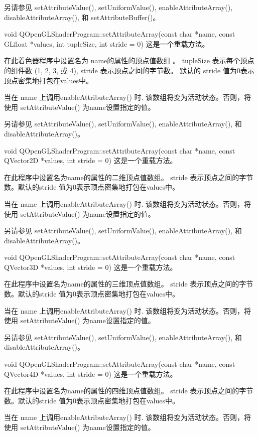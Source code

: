另请参见 setAttributeValue(), setUniformValue(), enableAttributeArray(), disableAttributeArray(), 和 setAttributeBuffer()。

void QOpenGLShaderProgram::setAttributeArray(const char *name, const GLfloat *values, int tupleSize, int stride = 0)
这是一个重载方法。

在此着色器程序中设置名为 name的属性的顶点值数组 。 tupleSize 表示每个顶点的组件数 (1, 2, 3, 或 4), stride 表示顶点之间的字节数。 默认的 stride 值为0表示顶点密集地打包在values中。

当在 name 上调用enableAttributeArray() 时. 该数组将变为活动状态。否则，将使用 setAttributeValue() 为name设置指定的值。

另请参见 setAttributeValue(), setUniformValue(), enableAttributeArray(), 和 disableAttributeArray()。

void QOpenGLShaderProgram::setAttributeArray(const char *name, const QVector2D *values, int stride = 0)
这是一个重载方法。

在此程序中设置名为name的属性的二维顶点值数组。 stride 表示顶点之间的字节数。默认的stride 值为0表示顶点密集地打包在values中。

当在 name 上调用enableAttributeArray() 时. 该数组将变为活动状态。否则，将使用 setAttributeValue() 为name设置指定的值。

另请参见 setAttributeValue(), setUniformValue(), enableAttributeArray(), 和 disableAttributeArray()。

void QOpenGLShaderProgram::setAttributeArray(const char *name, const QVector3D *values, int stride = 0)
这是一个重载方法。

在此程序中设置名为name的属性的三维顶点值数组。 stride 表示顶点之间的字节数。默认的stride 值为0表示顶点密集地打包在values中。

当在 name 上调用enableAttributeArray() 时. 该数组将变为活动状态。否则，将使用 setAttributeValue() 为name设置指定的值。

另请参见 setAttributeValue(), setUniformValue(), enableAttributeArray(), 和 disableAttributeArray()。

void QOpenGLShaderProgram::setAttributeArray(const char *name, const QVector4D *values, int stride = 0)
这是一个重载方法。

在此程序中设置名为name的属性的四维顶点值数组。 stride 表示顶点之间的字节数。默认的stride 值为0表示顶点密集地打包在values中。

当在 name 上调用enableAttributeArray() 时. 该数组将变为活动状态。否则，将使用 setAttributeValue() 为name设置指定的值。

